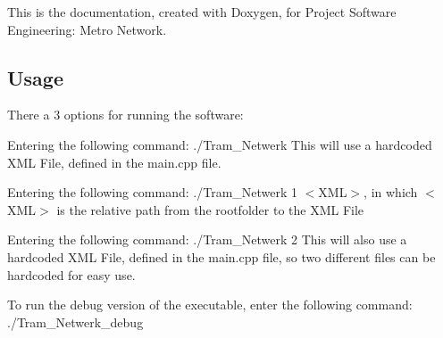 This is the documentation, created with Doxygen, for Project Software Engineering\+: Metro Network.

\subsection*{Usage }

There a 3 options for running the software\+:
\begin{DoxyEnumerate}
\item Entering the following command\+: ./\+Tram\+\_\+\+Netwerk This will use a hardcoded X\+ML File, defined in the main.\+cpp file.
\item Entering the following command\+: ./\+Tram\+\_\+\+Netwerk 1 $<$\+X\+M\+L$>$, in which $<$\+X\+M\+L$>$ is the relative path from the rootfolder to the X\+ML File
\item Entering the following command\+: ./\+Tram\+\_\+\+Netwerk 2 This will also use a hardcoded X\+ML File, defined in the main.\+cpp file, so two different files can be hardcoded for easy use.
\end{DoxyEnumerate}

To run the debug version of the executable, enter the following command\+: ./\+Tram\+\_\+\+Netwerk\+\_\+debug 